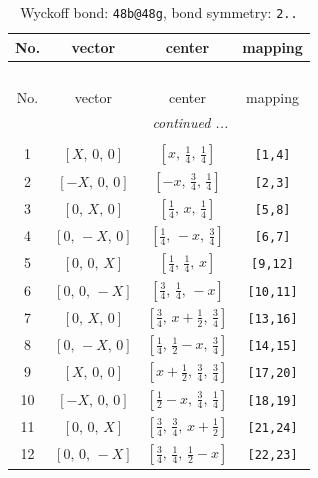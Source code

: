 \documentclass[fleqn,8pt]{jsarticle}
\begin{document}
\renewcommand{\arraystretch}{1.2}
\begin{longtable}{cccc}
\caption{Wyckoff bond: {\tt 48b@48g}, bond symmetry: {\tt 2..}}
 \\
 \hline \hline
No. & vector & center & mapping \\ \hline \endfirsthead

\multicolumn{3}{l}{\tablename\ \thetable{}} \\
 \hline \hline
No. & vector & center & mapping \\ \hline \endhead

 \hline \hline
\multicolumn{3}{r}{\footnotesize\it continued ...} \\ \endfoot

 \hline \hline
\multicolumn{3}{r}{} \\ \endlastfoot

1 & $\left[ X,\, 0,\, 0 \right]$ & $\left[ x,\, \frac{1}{4},\, \frac{1}{4} \right]$ & {\tt [1,4]} \\ \hline
2 & $\left[ - X,\, 0,\, 0 \right]$ & $\left[ - x,\, \frac{3}{4},\, \frac{1}{4} \right]$ & {\tt [2,3]} \\ \hline
3 & $\left[ 0,\, X,\, 0 \right]$ & $\left[ \frac{1}{4},\, x,\, \frac{1}{4} \right]$ & {\tt [5,8]} \\ \hline
4 & $\left[ 0,\, - X,\, 0 \right]$ & $\left[ \frac{1}{4},\, - x,\, \frac{3}{4} \right]$ & {\tt [6,7]} \\ \hline
5 & $\left[ 0,\, 0,\, X \right]$ & $\left[ \frac{1}{4},\, \frac{1}{4},\, x \right]$ & {\tt [9,12]} \\ \hline
6 & $\left[ 0,\, 0,\, - X \right]$ & $\left[ \frac{3}{4},\, \frac{1}{4},\, - x \right]$ & {\tt [10,11]} \\ \hline
7 & $\left[ 0,\, X,\, 0 \right]$ & $\left[ \frac{3}{4},\, x + \frac{1}{2},\, \frac{3}{4} \right]$ & {\tt [13,16]} \\ \hline
8 & $\left[ 0,\, - X,\, 0 \right]$ & $\left[ \frac{1}{4},\, \frac{1}{2} - x,\, \frac{3}{4} \right]$ & {\tt [14,15]} \\ \hline
9 & $\left[ X,\, 0,\, 0 \right]$ & $\left[ x + \frac{1}{2},\, \frac{3}{4},\, \frac{3}{4} \right]$ & {\tt [17,20]} \\ \hline
10 & $\left[ - X,\, 0,\, 0 \right]$ & $\left[ \frac{1}{2} - x,\, \frac{3}{4},\, \frac{1}{4} \right]$ & {\tt [18,19]} \\ \hline
11 & $\left[ 0,\, 0,\, X \right]$ & $\left[ \frac{3}{4},\, \frac{3}{4},\, x + \frac{1}{2} \right]$ & {\tt [21,24]} \\ \hline
12 & $\left[ 0,\, 0,\, - X \right]$ & $\left[ \frac{3}{4},\, \frac{1}{4},\, \frac{1}{2} - x \right]$ & {\tt [22,23]} \\
\end{longtable}
\end{document}
